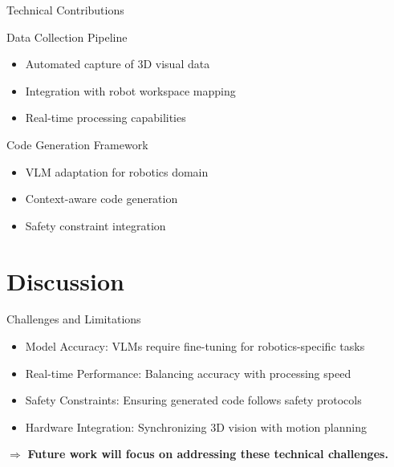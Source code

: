 \documentclass{beamer}
\begin{document}
\begin{frame}{Technical Contributions}
    \begin{block}{Data Collection Pipeline}
        \begin{itemize}
            \item Automated capture of 3D visual data
            \item Integration with robot workspace mapping
            \item Real-time processing capabilities
        \end{itemize}
    \end{block}
    
    \begin{block}{Code Generation Framework}
        \begin{itemize}
            \item VLM adaptation for robotics domain
            \item Context-aware code generation
            \item Safety constraint integration
        \end{itemize}
    \end{block}
    
\end{frame}
            
\section{Discussion} 
    
\begin{frame}{Challenges and Limitations}
    \begin{itemize}
        \item \alert{Model Accuracy:} VLMs require fine-tuning for robotics-specific tasks
        \item \alert{Real-time Performance:} Balancing accuracy with processing speed
        \item \alert{Safety Constraints:} Ensuring generated code follows safety protocols
        \item \alert{Hardware Integration:} Synchronizing 3D vision with motion planning
    \end{itemize}
    
    $\Rightarrow$ \textbf{Future work will focus on addressing these technical challenges.}
    
\end{frame}
\end{document}
